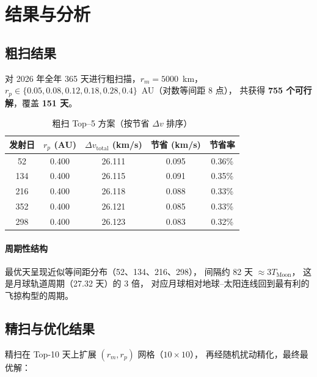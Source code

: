 \documentclass[a4paper,12pt]{article}
\begin{document}
\section{结果与分析}\label{sec:results}

\subsection{粗扫结果}

对 2026 年全年 365 天进行粗扫描，$r_m = 5000$~km，
$r_p \in \{0.05, 0.08, 0.12, 0.18, 0.28, 0.4\}$~AU（对数等间距 8 点），
共获得 \textbf{755 个可行解}，覆盖 \textbf{151 天}。

\begin{table}[H]
  \centering
  \caption{粗扫 Top--5 方案（按节省 $\Delta v$ 排序）}\label{tab:coarse}
  \begin{tabular}{ccccc}
    \toprule
    发射日 & $r_p$ (AU) & $\Delta v_{\mathrm{total}}$ (km/s) & 节省 (km/s) & 节省率 \\
    \midrule
    52  & 0.400 & 26.111 & 0.095 & 0.36\% \\
    134 & 0.400 & 26.115 & 0.091 & 0.35\% \\
    216 & 0.400 & 26.118 & 0.088 & 0.33\% \\
    352 & 0.400 & 26.121 & 0.085 & 0.33\% \\
    298 & 0.400 & 26.123 & 0.083 & 0.32\% \\
    \bottomrule
  \end{tabular}
\end{table}

\paragraph{周期性结构}
最优天呈现近似等间距分布（52、134、216、298），
间隔约 82 天 $\approx 3 T_{\mathrm{Moon}}$，
这是月球轨道周期（27.32 天）的 3 倍，
对应月球相对地球--太阳连线回到最有利的飞掠构型的周期。

\subsection{精扫与优化结果}

精扫在 Top-10 天上扩展 $(r_m, r_p)$ 网格（$10 \times 10$），
再经随机扰动精化，最终最优解：
\end{document}
